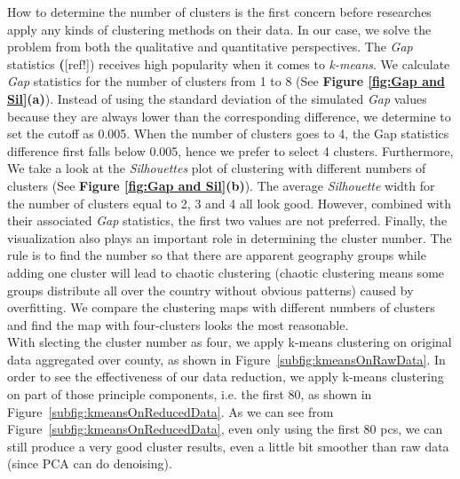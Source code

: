 \qquad How to determine the number of clusters is the first concern before researches apply any kinds of clustering methods on their data. In our case, we solve the problem from both the qualitative and quantitative perspectives. The \textit{Gap} statistics \textbf([ref!]) \cite{gap} receives high popularity when it comes to \textit{k-means}. We calculate \textit{Gap} statistics for the number of clusters from 1 to 8 (See \textbf{Figure \ref{fig:Gap and Sil}(a)}). Instead of using the standard deviation of the simulated \textit{Gap} values because they are always lower than the corresponding difference, we determine to set the cutoff as 0.005. When the number of clusters goes to 4, the Gap statistics difference first falls below 0.005, hence we prefer to select 4 clusters. Furthermore, We take a look at the \textit{Silhouettes} plot \cite{silhouettes} of clustering with different numbers of clusters (See \textbf{Figure \ref{fig:Gap and Sil}(b)}). The average \textit{Silhouette} width for the number of clusters equal to 2, 3 and 4 all look good. However, combined with their associated \textit{Gap} statistics, the first two values are not preferred. Finally, the visualization also plays an important role in determining the cluster number. The rule is to find the number so that there are apparent geography groups while adding one cluster will lead to chaotic clustering (chaotic clustering means some groups distribute all over the country without obvious patterns) caused by overfitting. We compare the clustering maps with different numbers of clusters and find the map with four-clusters looks the most reasonable.\\


\qquad With slecting the cluster number as four, we apply k-means clustering on original data aggregated over county, as shown in
Figure~\ref{subfig:kmeansOnRawData}. In order to see the effectiveness 
of our data reduction, we apply k-means clustering on part of those
 principle components, i.e. the first 80, as shown in
Figure~\ref{subfig:kmeansOnReducedData}. As we can see from Figure~\ref{subfig:kmeansOnReducedData},
even only using the first 80 pcs, we can still produce a very good
cluster results, even a little bit smoother than raw data (since PCA can do denoising).\\

